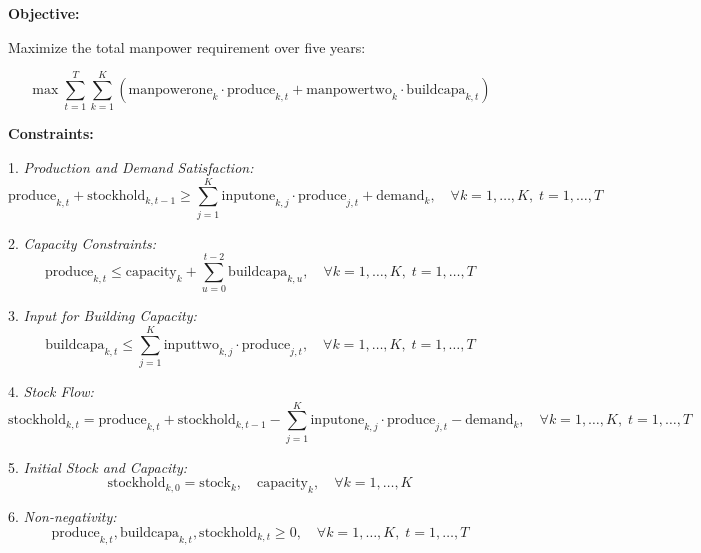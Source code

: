 \documentclass{article}
\begin{document}
\textbf{Objective:}

Maximize the total manpower requirement over five years:

\[
\max \sum_{t=1}^{T} \sum_{k=1}^{K} \left( \text{manpowerone}_k \cdot \text{produce}_{k,t} + \text{manpowertwo}_k \cdot \text{buildcapa}_{k,t} \right)
\]

\textbf{Constraints:}

1. \textit{Production and Demand Satisfaction:}
\[
\text{produce}_{k,t} + \text{stockhold}_{k,t-1} \geq \sum_{j=1}^{K} \text{inputone}_{k,j} \cdot \text{produce}_{j,t} + \text{demand}_k, \quad \forall k = 1,\ldots,K, \; t = 1,\ldots,T
\]

2. \textit{Capacity Constraints:}
\[
\text{produce}_{k,t} \leq \text{capacity}_{k} + \sum_{u=0}^{t-2} \text{buildcapa}_{k,u}, \quad \forall k = 1,\ldots,K, \; t = 1,\ldots,T
\]

3. \textit{Input for Building Capacity:}
\[
\text{buildcapa}_{k,t} \leq \sum_{j=1}^{K} \text{inputtwo}_{k,j} \cdot \text{produce}_{j,t}, \quad \forall k = 1,\ldots,K, \; t = 1,\ldots,T
\]

4. \textit{Stock Flow:}
\[
\text{stockhold}_{k,t} = \text{produce}_{k,t} + \text{stockhold}_{k,t-1} - \sum_{j=1}^{K} \text{inputone}_{k,j} \cdot \text{produce}_{j,t} - \text{demand}_k, \quad \forall k = 1,\ldots,K, \; t = 1,\ldots,T
\]

5. \textit{Initial Stock and Capacity:}
\[
\text{stockhold}_{k,0} = \text{stock}_k, \quad \text{capacity}_k, \quad \forall k = 1,\ldots,K
\]

6. \textit{Non-negativity:}
\[
\text{produce}_{k,t}, \text{buildcapa}_{k,t}, \text{stockhold}_{k,t} \geq 0, \quad \forall k = 1,\ldots,K, \; t = 1,\ldots,T
\]
\end{document}
